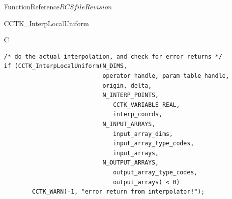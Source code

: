 \begin{cactuspart}{FunctionReference}{$RCSfile$}{$Revision$}
\begin{FunctionDescription}{CCTK\_InterpLocalUniform}
\begin{ExampleSection}
\begin{Example}{C}
\begin{verbatim}
/* do the actual interpolation, and check for error returns */
if (CCTK_InterpLocalUniform(N_DIMS,
                            operator_handle, param_table_handle,
                            origin, delta,
                            N_INTERP_POINTS,
                               CCTK_VARIABLE_REAL,
                               interp_coords,
                            N_INPUT_ARRAYS,
                               input_array_dims,
                               input_array_type_codes,
                               input_arrays,
                            N_OUTPUT_ARRAYS,
                               output_array_type_codes,
                               output_arrays) < 0)
        CCTK_WARN(-1, "error return from interpolator!");
\end{verbatim}
\end{Example}
\end{ExampleSection}
\end{FunctionDescription}



\end{cactuspart}
